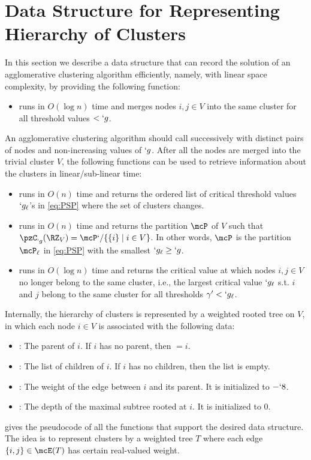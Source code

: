 \section{Data Structure for Representing Hierarchy of Clusters}
\label{sec:data_structure}

In this section we describe a data structure that can record the solution of an agglomerative
clustering algorithm efficiently, namely, with linear space complexity, by providing the following function:
\begin{itemize}
	\item {} runs in $O(\log n)$ time and
	merges nodes $i,j\in V$ into the same cluster for all threshold values $<`g$.
\end{itemize} 
An agglomerative clustering algorithm should call \merge successively with distinct pairs of nodes and 
non-increasing values of $`g$. After all the nodes are merged into the trivial cluster $V$, the
following functions can be used to retrieve information about the clusters in linear/sub-linear
time:
\begin{itemize}
	\item \getCriticalValues{} runs in $O(n)$ time and returns the ordered list of critical threshold
		values $`g_{\ell}$'s in \eqref{eq:PSP} where the set of clusters changes.
	\item {} runs in $O(n)$ time and returns the partition $\mcP$ of $V$ such that
		$\pzC_{`g}(\RZ_V)=\mcP`/\Set {\Set {i}\mid i\in V}$. In other words, $\mcP$ is the partition
		$\mcP_{\ell}$ in \eqref{eq:PSP} with the smallest $`g_{\ell}\geq `g$.
	\item {} runs in $O(\log n)$ time and returns the critical value at which nodes $i,j\in V$ no longer belong to the same cluster, i.e., the largest critical value $`g_{\ell}$ s.t. $i$ and $j$ belong to the same cluster for all thresholds $\gamma' < `g_{\ell}$.

\end{itemize}

Internally, the hierarchy of clusters is represented by a weighted rooted tree on $V$, in which each
node $i\in V$ is associated with the following data:
\begin{itemize}
	\item {}: The parent of $i$. If $i$ has no parent, then $=i$.
	\item {}: The list of children of $i$. If $i$ has no children, then the list is empty.
	\item {}: The weight of the edge between $i$ and its parent. It is initialized to $-`8$.
	\item {}: The depth of the maximal subtree rooted at $i$. It is initialized to $0$.
\end{itemize}
 gives the pseudocode of all the functions that support the desired data structure. The idea is to represent clusters by a weighted tree $T$ where each
edge $\Set {i,j}\in \mcE(T)$ has certain real-valued weight. %

